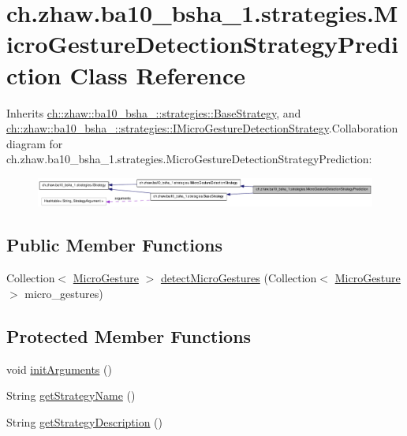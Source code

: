 \hypertarget{classch_1_1zhaw_1_1ba10__bsha__1_1_1strategies_1_1MicroGestureDetectionStrategyPrediction}{
\section{ch.zhaw.ba10\_\-bsha\_\-1.strategies.MicroGestureDetectionStrategyPrediction Class Reference}
\label{classch_1_1zhaw_1_1ba10__bsha__1_1_1strategies_1_1MicroGestureDetectionStrategyPrediction}
}


Inherits \hyperlink{classch_1_1zhaw_1_1ba10__bsha__1_1_1strategies_1_1BaseStrategy}{ch::zhaw::ba10\_\-bsha\_::strategies::BaseStrategy}, and \hyperlink{interfacech_1_1zhaw_1_1ba10__bsha__1_1_1strategies_1_1IMicroGestureDetectionStrategy}{ch::zhaw::ba10\_\-bsha\_::strategies::IMicroGestureDetectionStrategy}.Collaboration diagram for ch.zhaw.ba10\_\-bsha\_\-1.strategies.MicroGestureDetectionStrategyPrediction:\nopagebreak
\begin{figure}[H]
\begin{center}
\leavevmode
\includegraphics[width=400pt]{classch_1_1zhaw_1_1ba10__bsha__1_1_1strategies_1_1MicroGestureDetectionStrategyPrediction__coll__graph}
\end{center}
\end{figure}
\subsection*{Public Member Functions}
\begin{DoxyCompactItemize}
\item 
Collection$<$ \hyperlink{classch_1_1zhaw_1_1ba10__bsha__1_1_1service_1_1MicroGesture}{MicroGesture} $>$ \hyperlink{classch_1_1zhaw_1_1ba10__bsha__1_1_1strategies_1_1MicroGestureDetectionStrategyPrediction_af8639be36ae7218b7f7d2feee8edc86f}{detectMicroGestures} (Collection$<$ \hyperlink{classch_1_1zhaw_1_1ba10__bsha__1_1_1service_1_1MicroGesture}{MicroGesture} $>$ micro\_\-gestures)
\end{DoxyCompactItemize}
\subsection*{Protected Member Functions}
\begin{DoxyCompactItemize}
\item 
void \hyperlink{classch_1_1zhaw_1_1ba10__bsha__1_1_1strategies_1_1MicroGestureDetectionStrategyPrediction_a2ea70a5b663ee8417635fa4432e0acf6}{initArguments} ()
\item 
String \hyperlink{classch_1_1zhaw_1_1ba10__bsha__1_1_1strategies_1_1MicroGestureDetectionStrategyPrediction_a68da2773da59d52a57a8c57b4695fe14}{getStrategyName} ()
\item 
String \hyperlink{classch_1_1zhaw_1_1ba10__bsha__1_1_1strategies_1_1MicroGestureDetectionStrategyPrediction_af62bea565c797e4313d5150b7d6335ca}{getStrategyDescription} ()
\end{DoxyCompactItemize}
